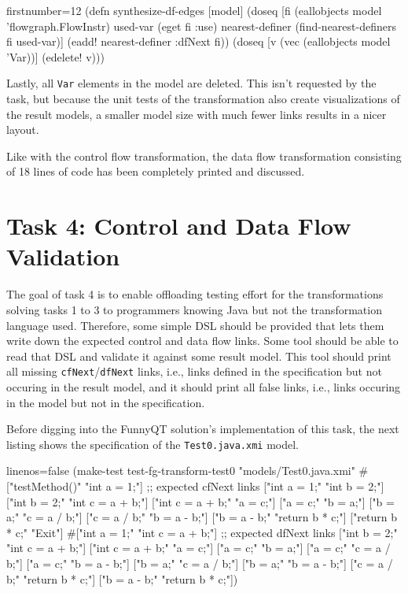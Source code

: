 \documentclass[11pt]{article}
\begin{document}
\begin{clojurecode*}{firstnumber=12}
(defn synthesize-df-edges [model]
  (doseq [fi (eallobjects model 'flowgraph.FlowInstr)
          used-var (eget fi :use)
          nearest-definer (find-nearest-definers fi used-var)]
    (eadd! nearest-definer :dfNext fi))
  (doseq [v (vec (eallobjects model 'Var))]
    (edelete! v)))
\end{clojurecode*}

Lastly, all \verb|Var| elements in the model are deleted.  This isn't requested
by the task, but because the unit tests of the transformation also create
visualizations of the result models, a smaller model size with much fewer links
results in a nicer layout.

Like with the control flow transformation, the data flow transformation
consisting of 18 lines of code has been completely printed and discussed.


\section{Task 4: Control and Data Flow Validation}
\label{sec:task-4}

The goal of task 4 is to enable offloading testing effort for the
transformations solving tasks 1 to 3 to programmers knowing Java but not the
transformation language used.  Therefore, some simple DSL should be provided
that lets them write down the expected control and data flow links.  Some tool
should be able to read that DSL and validate it against some result model.
This tool should print all missing \verb|cfNext|/\verb|dfNext| links, i.e.,
links defined in the specification but not occuring in the result model, and it
should print all false links, i.e., links occuring in the model but not in the
specification.

Before digging into the FunnyQT solution's implementation of this task, the
next listing shows the specification of the \verb|Test0.java.xmi| model.

\begin{clojurecode*}{linenos=false}
(make-test test-fg-transform-test0 "models/Test0.java.xmi"
           #{["testMethod()"   "int a = 1;"]     ;; expected cfNext links
             ["int a = 1;"     "int b = 2;"]
             ["int b = 2;"     "int c = a + b;"]
             ["int c = a + b;" "a = c;"]
             ["a = c;"         "b = a;"]
             ["b = a;"         "c = a / b;"]
             ["c = a / b;"     "b = a - b;"]
             ["b = a - b;"     "return b * c;"]
             ["return b * c;"  "Exit"]}
           #{["int a = 1;"     "int c = a + b;"] ;; expected dfNext links
             ["int b = 2;"     "int c = a + b;"]
             ["int c = a + b;" "a = c;"]
             ["a = c;"         "b = a;"]
             ["a = c;"         "c = a / b;"]
             ["a = c;"         "b = a - b;"]
             ["b = a;"         "c = a / b;"]
             ["b = a;"         "b = a - b;"]
             ["c = a / b;"     "return b * c;"]
             ["b = a - b;"     "return b * c;"]})
\end{clojurecode*}
\end{document}
